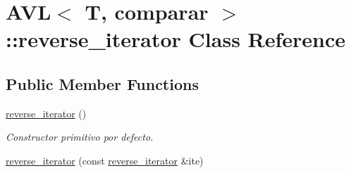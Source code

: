 \hypertarget{classAVL_1_1reverse__iterator}{\section{A\-V\-L$<$ T, comparar $>$\-:\-:reverse\-\_\-iterator Class Reference}
\label{classAVL_1_1reverse__iterator}
}
\subsection*{Public Member Functions}
\begin{DoxyCompactItemize}
\item 
\hypertarget{classAVL_1_1reverse__iterator_af239aff30ff4de837f56ae0b399f975b}{\hyperlink{classAVL_1_1reverse__iterator_af239aff30ff4de837f56ae0b399f975b}{reverse\-\_\-iterator} ()}\label{classAVL_1_1reverse__iterator_af239aff30ff4de837f56ae0b399f975b}

\begin{DoxyCompactList}\small\item\em Constructor primitivo por defecto. \end{DoxyCompactList}\item 
\hypertarget{classAVL_1_1reverse__iterator_a2d1f7da1f1686bd3457ac7e45180379f}{\hyperlink{classAVL_1_1reverse__iterator_a2d1f7da1f1686bd3457ac7e45180379f}{reverse\-\_\-iterator} (const \hyperlink{classAVL_1_1reverse__iterator}{reverse\-\_\-iterator} \&ite)}\label{classAVL_1_1reverse__iterator_a2d1f7da1f1686bd3457ac7e45180379f}


\end{DoxyCompactItemize}
